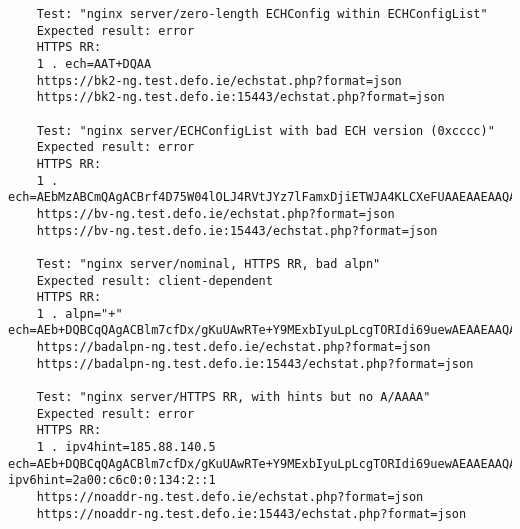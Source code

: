 \begin{verbatim}
    Test: "nginx server/zero-length ECHConfig within ECHConfigList"
    Expected result: error
    HTTPS RR:
    1 . ech=AAT+DQAA
    https://bk2-ng.test.defo.ie/echstat.php?format=json
    https://bk2-ng.test.defo.ie:15443/echstat.php?format=json

    Test: "nginx server/ECHConfigList with bad ECH version (0xcccc)"
    Expected result: error
    HTTPS RR:
    1 . ech=AEbMzABCmQAgACBrf4D75W04lOLJ4RVtJYz7lFamxDjiETWJA4KLCXeFUAAEAAEAAQATcHVibGljLnRlc3QuZGVmby5pZQAA
    https://bv-ng.test.defo.ie/echstat.php?format=json
    https://bv-ng.test.defo.ie:15443/echstat.php?format=json

    Test: "nginx server/nominal, HTTPS RR, bad alpn"
    Expected result: client-dependent
    HTTPS RR:
    1 . alpn="+" ech=AEb+DQBCqQAgACBlm7cfDx/gKuUAwRTe+Y9MExbIyuLpLcgTORIdi69uewAEAAEAAQATcHVibGljLnRlc3QuZGVmby5pZQAA
    https://badalpn-ng.test.defo.ie/echstat.php?format=json
    https://badalpn-ng.test.defo.ie:15443/echstat.php?format=json

    Test: "nginx server/HTTPS RR, with hints but no A/AAAA"
    Expected result: error
    HTTPS RR:
    1 . ipv4hint=185.88.140.5 ech=AEb+DQBCqQAgACBlm7cfDx/gKuUAwRTe+Y9MExbIyuLpLcgTORIdi69uewAEAAEAAQATcHVibGljLnRlc3QuZGVmby5pZQAA ipv6hint=2a00:c6c0:0:134:2::1
    https://noaddr-ng.test.defo.ie/echstat.php?format=json
    https://noaddr-ng.test.defo.ie:15443/echstat.php?format=json


\end{verbatim}
